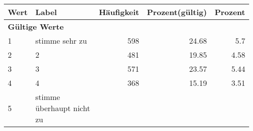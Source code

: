      \begin{longtable}{lXrrr}
     \toprule
     \textbf{Wert} & \textbf{Label} & \textbf{Häufigkeit} & \textbf{Prozent(gültig)} & \textbf{Prozent} \\
     \endhead
     \midrule
     \multicolumn{5}{l}{\textbf{Gültige Werte}}\\

     1 &
     \multicolumn{1}{X}{ stimme sehr zu   } &


       \num{598} &
       \num[round-mode=places,round-precision=2]{24,68} &
         \num[round-mode=places,round-precision=2]{5,7} \\

     2 &
     \multicolumn{1}{X}{ 2   } &


       \num{481} &
       \num[round-mode=places,round-precision=2]{19,85} &
         \num[round-mode=places,round-precision=2]{4,58} \\

     3 &
     \multicolumn{1}{X}{ 3   } &


       \num{571} &
       \num[round-mode=places,round-precision=2]{23,57} &
         \num[round-mode=places,round-precision=2]{5,44} \\

     4 &
     \multicolumn{1}{X}{ 4   } &


       \num{368} &
       \num[round-mode=places,round-precision=2]{15,19} &
         \num[round-mode=places,round-precision=2]{3,51} \\

     5 &
     \multicolumn{1}{X}{ stimme überhaupt nicht zu   } &



\end{longtable}
